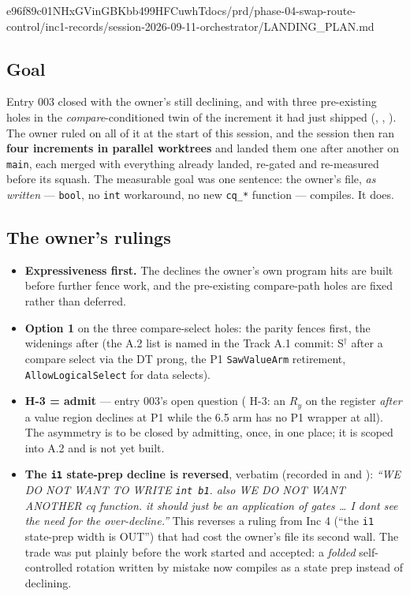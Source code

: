 %
  {e96f89c}{01NHxGVinGBKbb499HFCuwhT}{docs/prd/phase-04-swap-route-control/inc1-records/session-2026-09-11-orchestrator/LANDING\_PLAN.md}

\subsection*{Goal}
Entry 003 closed with the owner's  still declining, and
with three pre-existing holes in the \emph{compare}-conditioned twin of the increment it had just shipped
(, , ). The owner ruled on all of it at the start of this session, and the
session then ran \textbf{four increments in parallel worktrees} and landed them one after another on
\texttt{main}, each merged with everything already landed, re-gated and re-measured before its squash.
The measurable goal was one sentence: the owner's file, \emph{as written} --- \texttt{bool}, no
\texttt{int} workaround, no new \texttt{cq\_*} function --- compiles. It does.

\subsection*{The owner's rulings}
\begin{itemize}
  \item \textbf{Expressiveness first.} The declines the owner's own program hits are built before further
    fence work, and the pre-existing compare-path holes are fixed rather than deferred.
  \item \textbf{Option 1} on the three compare-select holes: the parity fences first, the widenings after
    (the A.2 list is named in the Track A.1 commit: S\(^\dagger\) after a compare select via the DT prong,
    the P1 \texttt{SawValueArm} retirement, \texttt{AllowLogicalSelect} for data selects).
  \item \textbf{H-3 = admit} --- entry 003's open question ( H-3: an
    \(R_y\) on the register \emph{after} a value region declines at P1 while the 6.5 arm has no P1
    wrapper at all). The asymmetry is to be closed by admitting, once, in one place; it is scoped into
    A.2 and is not yet built.
  \item \textbf{The \texttt{i1} state-prep decline is reversed}, verbatim (recorded in
     and ): \emph{``WE DO NOT WANT TO WRITE
    \texttt{int b1}. also WE DO NOT WANT ANOTHER cq function. it should just be an application of gates
    \ldots{} I dont see the need for the over-decline.''} This reverses a ruling from  Inc 4
    (``the \texttt{i1} state-prep width is OUT'') that had cost the owner's file its second wall. The
    trade was put plainly before the work started and accepted: a \emph{folded} self-controlled rotation
    written by mistake now compiles as a state prep instead of declining.
\end{itemize}

